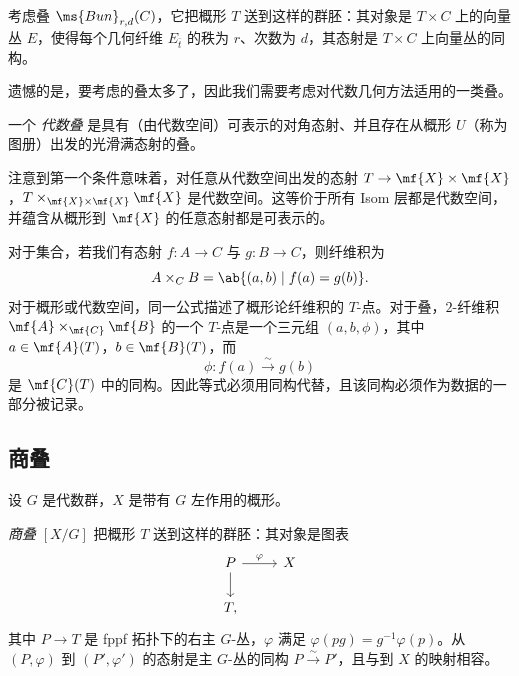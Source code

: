 \begin{exm}
    考虑叠 \(\ms{Bun}_{r,d}(C)\)，它把概形 \(T\) 送到这样的群胚：其对象是 \(T\times C\) 上的向量丛 \(E\)，使得每个几何纤维 \(E_{\bar t}\) 的秩为 \(r\)、次数为 \(d\)，其态射是 \(T\times C\) 上向量丛的同构。
\end{exm}

遗憾的是，要考虑的叠太多了，因此我们需要考虑对代数几何方法适用的一类叠。

\begin{defn}
    一个 \textit{代数叠} 是具有（由代数空间）可表示的对角态射、并且存在从概形 \(U\)（称为图册）出发的光滑满态射的叠。
\end{defn}

注意到第一个条件意味着，对任意从代数空间出发的态射 \(T \to \mf{X} \times \mf{X}\)，\(T \times_{\mf{X} \times \mf{X}} \mf{X}\) 是代数空间。这等价于所有 Isom 层都是代数空间，并蕴含从概形到 \(\mf{X}\) 的任意态射都是可表示的。

\begin{rmk}
    对于集合，若我们有态射 \(f\colon A\to C\) 与 \(g\colon B\to C\)，则纤维积为
    \[ 
        A\times_C B=\ab\{(a,b)\mid f(a)=g(b)\}. 
    \] 
    对于概形或代数空间，同一公式描述了概形论纤维积的 \(T\)-点。对于叠，\(2\)-纤维积 \(\mf{A}\times_{\mf{C}}\mf{B}\) 的一个 \(T\)-点是一个三元组 \((a,b,\phi)\)，其中 \(a\in\mf{A}(T)\)，\(b\in\mf{B}(T)\)，而
    \[ 
        \phi\colon f(a)\xrightarrow{\sim}g(b) 
    \]
    是 \(\mf{C}(T)\) 中的同构。因此等式必须用同构代替，且该同构必须作为数据的一部分被记录。
\end{rmk}


\subsection{商叠}%
\label{sub:Quotient stacks}

设 \(G\) 是代数群，\(X\) 是带有 \(G\) 左作用的概形。

\begin{defn}
    \textit{商叠} \([X/G]\) 把概形 \(T\) 送到这样的群胚：其对象是图表
    \begin{equation*}
    \begin{tikzcd}
        P \ar{r}{\varphi} \ar{d} & X \\
        T,
    \end{tikzcd}
    \end{equation*}
    其中 \(P\to T\) 是 fppf 拓扑下的右主 \(G\)-丛，\(\varphi\) 满足 \(\varphi(pg)=g^{-1}\varphi(p)\)。从 \((P,\varphi)\) 到 \((P',\varphi')\) 的态射是主 \(G\)-丛的同构 \(P\xrightarrow{\sim}P'\)，且与到 \(X\) 的映射相容。
\end{defn}

